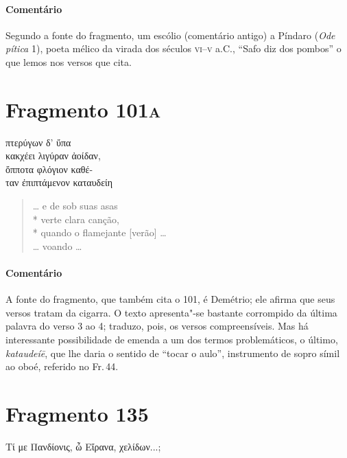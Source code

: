 \medskip

{\paragraph{Comentário} Segundo a fonte do fragmento, um escólio (comentário antigo) a Píndaro
(\textit{Ode pítica} 1), poeta mélico da virada dos séculos \textsc{vi}--\textsc{v} a.C.,
``Safo diz dos pombos'' o que lemos nos versos que cita.}


\section{Fragmento 101\textsc{a}}

\begin{gkverse}
πτερύγων δ’ ὔπα\\
κακχέει λιγύραν ἀοίδαν,\\
ὄπποτα φλόγιον \dagger{}καθέ-\\
ταν\dagger{} ἐπιπτάμενον \dagger{}καταυδείη\dagger{}
\end{gkverse}

\begin{verse}
\ldots{} e de sob suas asas\\*
verte clara canção,\\*
quando o flamejante [verão] \ldots{}\\
\ldots{} voando \ldots{}
\end{verse}

\medskip

{\paragraph{Comentário} A fonte do fragmento, que também cita o 101, é Demétrio; ele afirma que seus versos tratam da cigarra. O texto apresenta"-se bastante corrompido da última palavra do verso 3 ao 4; traduzo, pois, os versos compreensíveis. Mas há interessante possibilidade de emenda a um dos termos problemáticos, o último, \textit{kataudeíē}, que lhe daria o sentido de ``tocar o aulo'', instrumento de sopro símil ao oboé, referido no Fr.\,44.}



\pagebreak
\section{Fragmento 135}

\begin{gkverse}
Τί με Πανδίονις, ὦ Εἴρανα, χελίδων...;
\end{gkverse}

